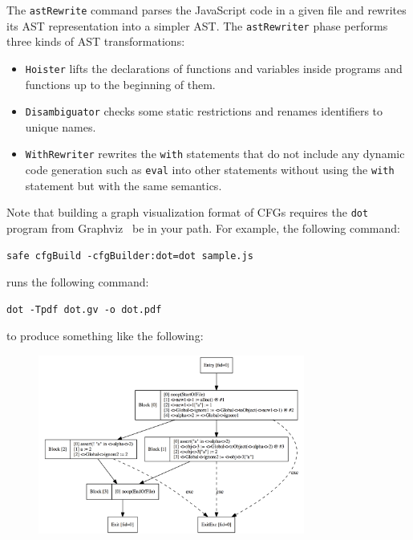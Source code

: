 \medskip
The \verb!astRewrite! command parses the JavaScript code in a given file and
rewrites its AST representation into a simpler AST.
The \verb!astRewriter! phase performs three kinds of AST transformations:
\begin{itemize}
\item \verb!Hoister! lifts the declarations of functions and variables inside
programs and functions up to the beginning of them.
\item \verb!Disambiguator! checks some static restrictions and renames identifiers
to unique names.
\item \verb!WithRewriter! rewrites the \verb!with! statements that do not include
any dynamic code generation such as \verb!eval! into other statements without using
the \verb!with! statement but with the same semantics.
\end{itemize}

Note that building a graph visualization format of CFGs requires the \verb!dot! program
from Graphviz~\cite{graphviz} be in your path.
For example, the following command:
\begin{verbatim}
safe cfgBuild -cfgBuilder:dot=dot sample.js
\end{verbatim}
runs the following command:
\begin{verbatim}
dot -Tpdf dot.gv -o dot.pdf
\end{verbatim}
to produce something like the following:
\begin{figure}[H]
\includegraphics[width=8.75cm]{cfg.png}
\end{figure}

